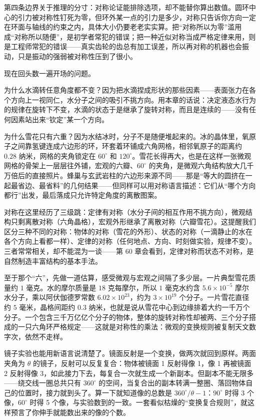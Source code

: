 第四条边界关于推理的分寸：对称论证能排除选项，却不能替你算出数值。圆环中心的引力被对称性钉死为零，但环外某一点的引力是多少，对称只告诉你方向一定在环面与轴线的约束之内，具体大小仍要老老实实算。把“对称所以为零”滥用成“对称所以随便”，是初学者常犯的错误；把一种近似对称当成严格定律来用，则是工程师常犯的错误——真实齿轮的齿总有加工误差，所以再对称的机器也会振动，只是振动的强弱被对称性压到了很小。


现在回头数一遍开场的问题。

为什么水滴转任意角度都不变？因为把水滴捏成形状的那些因素——表面张力在各个方向上一视同仁，水分子之间的吸引不挑方向。用本章的话说：决定液态水行为的规律在旋转下不变，水滴的状态于是继承了旋转对称，而且是连续的——没有任何因素站出来“钦定”某一个方向。

为什么雪花只有六重？因为水结冰时，分子不是随便堆起来的。冰的晶体里，氧原子之间靠氢键连成六边形的环，环套着环铺成六角网格，相邻氧原子的距离约 \(0.28\) 纳米，网格的夹角锁定在 \(60^\circ\) 和 \(120^\circ\)。雪花长得再大，也是在这样一张微观网格的骨架上一层层往外铺，宏观的六瓣、\(60^\circ\) 的夹角，是微观六角结构放大几千万倍后的直接照片。蜂巢与玄武岩柱的六边形来源不同——那是“等大的圆挤在一起最省边、最省料”的几何结果——但同样可以用对称语言描述：它们从“哪个方向都行”出发，最后落成只允许特定角度的离散图案。

对称在这里经历了三级跳：定律有对称（水分子间的相互作用不挑方向），微观结构只剩离散对称（六角晶格），宏观外形继承了离散对称（六瓣雪花）。这提醒我们区分三种不同的对称：物体的对称（雪花的外形）、状态的对称（一滴静止的水在各个方向上看都一样）、定律的对称（任何地点、方向、时刻做实验，规律不变）。三者常常相关，却不能混为一谈——第 60 章会看到，定律对称而状态不对称，是自然制造丰富结构的基本手法。

至于那个“六”，先做一道估算，感受微观与宏观之间隔了多少层。一片典型雪花质量约 \(1\) 毫克。水的摩尔质量是 \(18\) 克每摩尔，所以 \(1\) 毫克水约含 \(5.6\times10^{-5}\) 摩尔水分子，乘以阿伏伽德罗常数 \(6.02\times10^{23}\)，约为 \(3\times10^{19}\) 个分子。一片雪花直径约 \(5\) 毫米，晶格间距约 \(0.3\) 纳米，也就是说从雪花中心到边缘排着大约一千万个分子。一个包含三千万亿亿个分子的物体，整体的旋转对称性却被两、三个分子搭成的一只六角环严格规定——这就是对称性的乘法：微观的变换规则被复制天文数字次，依然不走样。

镜子实验也能用新语言说清楚了。镜面反射是一个变换，做两次就回到原样。两面夹角为 \(\theta\) 的镜子，反射可以反复复合：物体被镜面 1 反射得像 1，像 1 再被镜面 2 反射得像 3，如此接力下去，每复合一次就生成一个新副本。但副本不能无限多——绕交线一圈总共只有 \(360^\circ\) 的空间，当复合出的副本转满一整圈、落回物体自己的位置时，接力就到头了。算一下就知道像的总数是 \(360^\circ/\theta-1\)：\(90^\circ\) 时得 3 个像，\(60^\circ\) 时得 5 个像，与实验数到的一致。一套看似枯燥的“变换复合规则”，就这样预言了你伸手就能数出来的像的个数。

